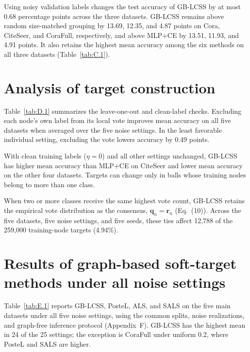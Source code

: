 \documentclass[a4paper,fleqn]{cas-sc}
\begin{document}


Using noisy validation labels changes the test accuracy of GB-LCSS by at most 0.68 percentage points across the three datasets. GB-LCSS remains above random size-matched grouping by 13.69, 12.35, and 4.87 points on Cora, CiteSeer, and CoraFull, respectively, and above MLP+CE by 13.51, 11.93, and 4.91 points. It also retains the highest mean accuracy among the six methods on all three datasets (Table~\ref{tab:C.1}).
\setcounter{table}{0}

\section{Analysis of target construction}\label{sec:D}

Table~\ref{tab:D.1} summarizes the leave-one-out and clean-label checks. Excluding each node's own label from its local vote improves mean accuracy on all five datasets when averaged over the five noise settings. In the least favorable individual setting, excluding the vote lowers accuracy by 0.49 points.

With clean training labels (\(\eta=0\)) and all other settings unchanged, GB-LCSS has higher mean accuracy than MLP+CE on CiteSeer and lower mean accuracy on the other four datasets. Targets can change only in balls whose training nodes belong to more than one class.



When two or more classes receive the same highest vote count, GB-LCSS retains the empirical vote distribution as the consensus, \(\mathbf q_n=\mathbf r_n\) (Eq.~(10)). Across the five datasets, five noise settings, and five seeds, these ties affect 12,788 of the 259,000 training-node targets (4.94\%).

\setcounter{table}{0}

\section{Results of graph-based soft-target methods under all noise settings}\label{sec:E}

Table~\ref{tab:E.1} reports GB-LCSS, PosteL, ALS, and SALS on the five main datasets under all five noise settings, using the common splits, noise realizations, and graph-free inference protocol (Appendix~F). GB-LCSS has the highest mean in 24 of the 25 settings; the exception is CoraFull under uniform 0.2, where PosteL and SALS are higher.
\end{document}
